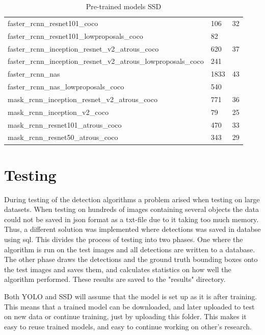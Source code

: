 \begin{table}[h!]
\begin{tabular}{lll}
faster\_rcnn\_resnet101\_coco                                   & 106         & 32                                \\
faster\_rcnn\_resnet101\_lowproposals\_coco                     & 82          &                                   \\
faster\_rcnn\_inception\_resnet\_v2\_atrous\_coco               & 620         & 37                                \\
faster\_rcnn\_inception\_resnet\_v2\_atrous\_lowproposals\_coco & 241         &                                   \\
faster\_rcnn\_nas                                               & 1833        & 43                                \\
faster\_rcnn\_nas\_lowproposals\_coco                           & 540         &                                   \\
mask\_rcnn\_inception\_resnet\_v2\_atrous\_coco                 & 771         & 36                                \\
mask\_rcnn\_inception\_v2\_coco                                 & 79          & 25                                \\
mask\_rcnn\_resnet101\_atrous\_coco                             & 470         & 33                                \\
mask\_rcnn\_resnet50\_atrous\_coco                              & 343         & 29                               
\end{tabular}
\caption{Pre-trained models SSD}
\label{ssd_tab}
\end{table}


\newpage

\section{Testing}
During testing of the detection algorithms a problem arised when testing on large datasets. When testing on hundreds of images containing several objects the data could not be saved in json format as a txt-file due to it taking too much memory. Thus, a different solution was implemented where detections was saved in databse using sql. This divides the process of testing into two phases. One where the algorithm is run on the test images and all detections are written to a database. The other phase draws the detections and the ground truth bounding boxes onto the test images and saves them, and calculates statistics on how well the algorithm performed. These results are saved to the "results" directory.

\vspace{3mm}

Both YOLO and SSD will assume that the model is set up as it is after training. This means that a trained model can be downloaded, and later uploaded to test on new data or continue training, just by uploading this folder. This makes it easy to reuse trained models, and easy to continue working on other's research.









\cleardoublepage